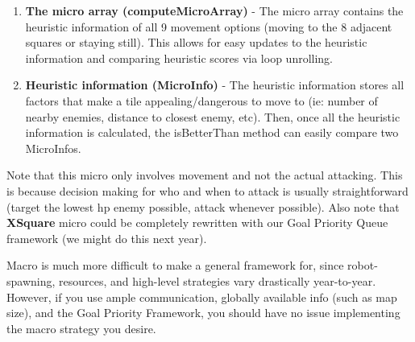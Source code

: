 \begin{enumerate}
\begin{itemize}
\begin{enumerate}
          \item \textbf{The micro array (computeMicroArray)} - The micro array contains the heuristic information of all 9 movement options (moving to the 8 adjacent squares or staying still). This allows for easy updates to the heuristic information and comparing heuristic scores via loop unrolling.
          \item \textbf{Heuristic information (MicroInfo)} - The heuristic information stores all factors that make a tile appealing/dangerous to move to (ie: number of nearby enemies, distance to closest enemy, etc). Then, once all the heuristic information is calculated, the isBetterThan method can easily compare two MicroInfos. 
      \end{enumerate}
      Note that this micro only involves movement and not the actual attacking. This is because decision making for who and when to attack is usually straightforward (target the lowest hp enemy possible, attack whenever possible). Also note that \textbf{XSquare} micro could be completely rewritten with our Goal Priority Queue framework (we might do this next year).

      \medskip

      Macro is much more difficult to make a general framework for, since robot-spawning, resources, and high-level strategies vary drastically year-to-year. However, if you use ample communication, globally available info (such as map size), and the Goal Priority Framework, you should have no issue implementing the macro strategy you desire.


\end{itemize}
\end{enumerate}
